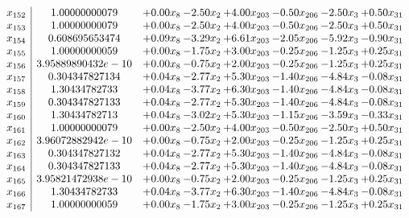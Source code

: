 \documentclass[8pt]{article}
\begin{document}
\[\begin{array}{c| c c@{\hskip 2pt} c@{\hskip 2pt} c@{\hskip 2pt} c@{\hskip 2pt} c@{\hskip 2pt} c@{\hskip 2pt} }
 x_{152}   &  1.00000000079 & +  0.00 x_{8} & -2.50 x_{2} & +  4.00 x_{203} & -0.50 x_{206} & -2.50 x_{3} & +  0.50 x_{31}\\
 x_{153}   &  1.00000000079 & +  0.00 x_{8} & -2.50 x_{2} & +  4.00 x_{203} & -0.50 x_{206} & -2.50 x_{3} & +  0.50 x_{31}\\
 x_{154}   &  0.608695653474 & +  0.09 x_{8} & -3.29 x_{2} & +  6.61 x_{203} & -2.05 x_{206} & -5.92 x_{3} & -0.90 x_{31}\\
 x_{155}   &  1.00000000059 & +  0.00 x_{8} & -1.75 x_{2} & +  3.00 x_{203} & -0.25 x_{206} & -1.25 x_{3} & +  0.25 x_{31}\\
 x_{156}   &  3.95889890432e-10 & +  0.00 x_{8} & -0.75 x_{2} & +  2.00 x_{203} & -0.25 x_{206} & -1.25 x_{3} & +  0.25 x_{31}\\
 x_{157}   &  0.304347827134 & +  0.04 x_{8} & -2.77 x_{2} & +  5.30 x_{203} & -1.40 x_{206} & -4.84 x_{3} & -0.08 x_{31}\\
 x_{158}   &  1.30434782733 & +  0.04 x_{8} & -3.77 x_{2} & +  6.30 x_{203} & -1.40 x_{206} & -4.84 x_{3} & -0.08 x_{31}\\
 x_{159}   &  0.304347827133 & +  0.04 x_{8} & -2.77 x_{2} & +  5.30 x_{203} & -1.40 x_{206} & -4.84 x_{3} & -0.08 x_{31}\\
 x_{160}   &  1.30434782713 & +  0.04 x_{8} & -3.02 x_{2} & +  5.30 x_{203} & -1.15 x_{206} & -3.59 x_{3} & -0.33 x_{31}\\
 x_{161}   &  1.00000000079 & +  0.00 x_{8} & -2.50 x_{2} & +  4.00 x_{203} & -0.50 x_{206} & -2.50 x_{3} & +  0.50 x_{31}\\
 x_{162}   &  3.96072882942e-10 & +  0.00 x_{8} & -0.75 x_{2} & +  2.00 x_{203} & -0.25 x_{206} & -1.25 x_{3} & +  0.25 x_{31}\\
 x_{163}   &  0.304347827132 & +  0.04 x_{8} & -2.77 x_{2} & +  5.30 x_{203} & -1.40 x_{206} & -4.84 x_{3} & -0.08 x_{31}\\
 x_{164}   &  0.304347827133 & +  0.04 x_{8} & -2.77 x_{2} & +  5.30 x_{203} & -1.40 x_{206} & -4.84 x_{3} & -0.08 x_{31}\\
 x_{165}   &  3.95821472938e-10 & +  0.00 x_{8} & -0.75 x_{2} & +  2.00 x_{203} & -0.25 x_{206} & -1.25 x_{3} & +  0.25 x_{31}\\
 x_{166}   &  1.30434782733 & +  0.04 x_{8} & -3.77 x_{2} & +  6.30 x_{203} & -1.40 x_{206} & -4.84 x_{3} & -0.08 x_{31}\\
 x_{167}   &  1.00000000059 & +  0.00 x_{8} & -1.75 x_{2} & +  3.00 x_{203} & -0.25 x_{206} & -1.25 x_{3} & +  0.25 x_{31}\\

\end{array}\]
\end{document}
